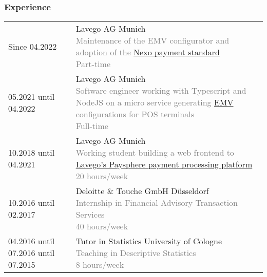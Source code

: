 \documentclass[USenglish]{article} %
\begin{document}
\subsubsection*{Experience}
\begin{table}[h]
  \begin{tabularx}{\textwidth}{@{}p{4cm}X}

    Since 04.2022 &
    Lavego AG \textbar{} Munich
    \textcolor{gray}{
      \newline Maintenance of the EMV configurator and adoption of the
        \href{https://www.nexo-standards.org}{Nexo payment standard}
      \newline Part-time} \\

    05.2021 until 04.2022 &
    Lavego AG \textbar{} Munich
    \textcolor{gray}{
      \newline Software engineer working with Typescript and NodeJS on a micro service
        generating \href{https://www.emvco.com}{EMV} configurations for POS terminals
      \newline Full-time} \\

    10.2018 until 04.2021 &
    Lavego AG \textbar{} Munich
    \textcolor{gray}{
      \newline Working student building a web frontend to 
        \href{https://www.nexo-standards.org/news/reinventing-wheel-how-lavego-ag-brought-innovation-pos-nexo-standards}{Lavego's Paysphere payment processing platform}
      \newline 20 hours/week} \\

    10.2016 until 02.2017 &
    Deloitte \& Touche GmbH \textbar{} Düsseldorf
    \textcolor{gray}{
      \newline Internship in Financial Advisory Transaction Services
      \newline 40 hours/week} \\

    04.2016 until 07.2016 \newline
    10.2014 until 07.2015 &
    Tutor in Statistics \textbar{} University of Cologne
    \textcolor{gray}{
      \newline Teaching in Descriptive Statistics
      \newline 8 hours/week} \\

  \end{tabularx}\label{tab:experience}
\end{table}
\end{document}
